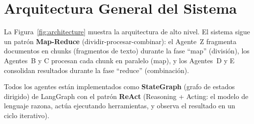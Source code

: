 \documentclass[10pt,twocolumn,letterpaper]{article}
\begin{document}
\section{Arquitectura General del Sistema}

La Figura~\ref{fig:architecture} muestra la arquitectura de alto nivel. El sistema
sigue un patr\'on \textbf{Map-Reduce} (dividir-procesar-combinar): el Agente~Z fragmenta
documentos en chunks (fragmentos de texto) durante la fase ``map'' (divisi\'on),
los Agentes~B y C procesan cada chunk en paralelo (map), y los Agentes~D
y E consolidan resultados durante la fase ``reduce'' (combinaci\'on).

Todos los agentes est\'an implementados como \textbf{StateGraph} (grafo de estados
dirigido) de LangGraph con el patr\'on \textbf{ReAct} (Reasoning + Acting: el modelo
de lenguaje razona, act\'ua ejecutando herramientas, y observa el resultado en un
ciclo iterativo).
\end{document}
